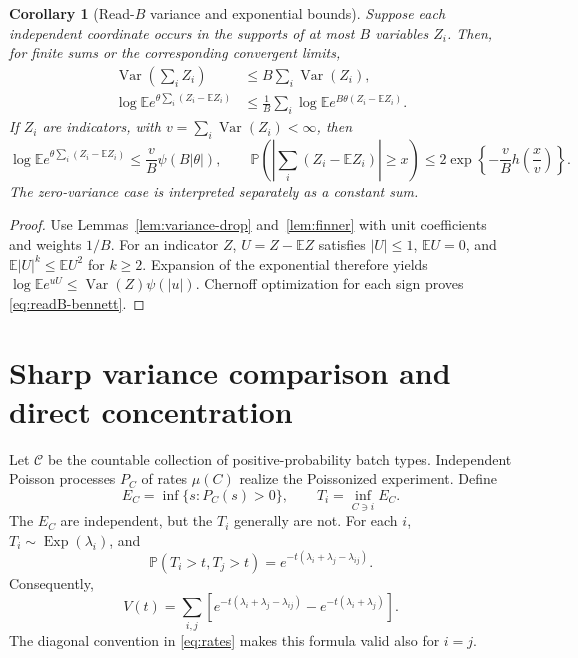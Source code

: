 \documentclass[11pt]{article}
\numberwithin{equation}{section}
\newtheorem{corollary}[theorem]{Corollary}
\theoremstyle{definition}
\theoremstyle{remark}
\newcommand{\E}{\mathbb E}
\newcommand{\Pp}{\mathbb P}
\newcommand{\Var}{\operatorname{Var}}
\newcommand{\Exp}{\operatorname{Exp}}
\begin{document}
\begin{corollary}[Read-$B$ variance and exponential bounds]\label{cor:readB}
Suppose each independent coordinate occurs in the supports of at most $B$
variables $Z_i$. Then, for finite sums or the corresponding convergent limits,
\begin{align}
 \Var\left(\sum_i Z_i\right)&\le B\sum_i\Var(Z_i),\label{eq:readvar}\\
 \log\E e^{\theta\sum_i(Z_i-\E Z_i)}
 &\le\frac1B\sum_i\log\E e^{B\theta(Z_i-\E Z_i)}.\label{eq:readmgf}
\end{align}
If $Z_i$ are indicators, with $v=\sum_i\Var(Z_i)<\infty$, then
\begin{equation}\label{eq:readB-bennett}
 \log\E e^{\theta\sum_i(Z_i-\E Z_i)}
 \le\frac vB\psi(B|\theta|),\qquad
 \Pp\left(\left|\sum_i(Z_i-\E Z_i)\right|\ge x\right)
 \le2\exp\left\{-\frac vB h\left(\frac xv\right)\right\}.
\end{equation}
The zero-variance case is interpreted separately as a constant sum.
\end{corollary}
\begin{proof}
Use Lemmas~\ref{lem:variance-drop} and~\ref{lem:finner} with unit coefficients
and weights $1/B$. For an indicator $Z$, $U=Z-\E Z$ satisfies $|U|\le1$,
$\E U=0$, and $\E|U|^k\le\E U^2$ for $k\ge2$. Expansion of the exponential
therefore yields
$\log\E e^{uU}\le\Var(Z)\psi(|u|)$.
Chernoff optimization for each sign proves \eqref{eq:readB-bennett}.
\end{proof}

\section{Sharp variance comparison and direct concentration}\label{sec:variance}

Let $\mathcal C$ be the countable collection of positive-probability batch
types. Independent Poisson processes $P_C$ of rates $\mu(C)$ realize the
Poissonized experiment. Define
\[
 E_C=\inf\{s:P_C(s)>0\},\qquad T_i=\inf_{C\ni i}E_C.
\]
The $E_C$ are independent, but the $T_i$ generally are not. For each $i$,
$T_i\sim\Exp(\lambda_i)$, and
\begin{equation}\label{eq:jointabsence}
 \Pp(T_i>t,T_j>t)
 =e^{-t(\lambda_i+\lambda_j-\lambda_{ij})}.
\end{equation}
Consequently,
\begin{equation}\label{eq:exactvariance}
 V(t)=\sum_{i,j}\left[
 e^{-t(\lambda_i+\lambda_j-\lambda_{ij})}
 -e^{-t(\lambda_i+\lambda_j)}\right].
\end{equation}
The diagonal convention in \eqref{eq:rates} makes this formula valid also for
$i=j$.
\end{document}
